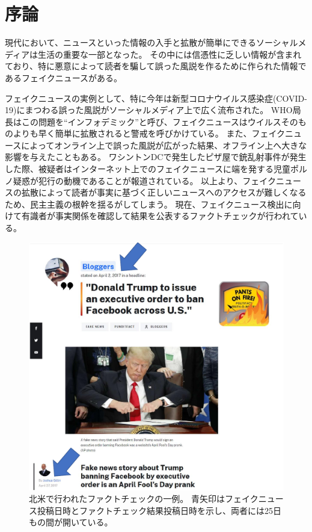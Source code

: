 \section{序論}
\label{ch:introduction}

現代において、ニュースといった情報の入手と拡散が簡単にできるソーシャルメディアは生活の重要な一部となった。
その中には信憑性に乏しい情報が含まれており、特に悪意によって読者を騙して誤った風説を作るために作られた情報であるフェイクニュースがある。

フェイクニュースの実例として、特に今年は新型コロナウイルス感染症(COVID-19)にまつわる誤った風説がソーシャルメディア上で広く流布された。
WHO局長はこの問題を``インフォデミック''と呼び、フェイクニュースはウイルスそのものよりも早く簡単に拡散されると警戒を呼びかけている。\cite{ZAROCOSTAS2020676}
また、フェイクニュースによってオンライン上で誤った風説が広がった結果、オフライン上へ大きな影響を与えたこともある。
ワシントンDCで発生したピザ屋で銃乱射事件が発生した際、被疑者はインターネット上でのフェイクニュースに端を発する児童ポルノ疑惑が犯行の動機であることが報道されている\cite{agencies_2016}。
以上より、フェイクニュースの拡散によって読者が事実に基づく正しいニュースへのアクセスが難しくなるため、民主主義の根幹を揺るがしてしまう。
現在、フェイクニュース検出に向けて有識者が事実関係を確認して結果を公表するファクトチェックが行われている。

\begin{figure}[t]
    \centering
    \includegraphics[width=\linewidth]{images/fact-check.pdf}
    \caption{
        北米で行われたファクトチェックの一例。
        青矢印はフェイクニュース投稿日時とファクトチェック結果投稿日時を示し、両者には25日もの間が開いている。
        }
    \label{fig:example}
\end{figure}

